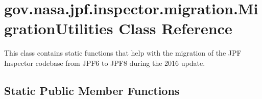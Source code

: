 \hypertarget{classgov_1_1nasa_1_1jpf_1_1inspector_1_1migration_1_1_migration_utilities}{}\section{gov.\+nasa.\+jpf.\+inspector.\+migration.\+Migration\+Utilities Class Reference}
\label{classgov_1_1nasa_1_1jpf_1_1inspector_1_1migration_1_1_migration_utilities}


This class contains static functions that help with the migration of the J\+PF Inspector codebase from J\+P\+F6 to J\+P\+F8 during the 2016 update.  


\subsection*{Static Public Member Functions}
